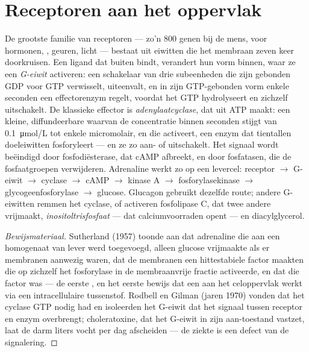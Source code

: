 \section{Receptoren aan het oppervlak}

\begin{proposition}\label{prop:b2:cell-signalling:gpcr}
De grootste familie van receptoren --- zo'n \num{800} genen bij de mens,
voor hormonen, , geuren, licht --- bestaat uit eiwitten die
het membraan zeven keer doorkruisen. Een ligand dat buiten bindt, verandert
hun vorm binnen, waar ze een \emph{G-eiwit} activeren: een schakelaar van
drie subeenheden die zijn gebonden GDP voor GTP verwisselt, uiteenvalt, en
in zijn GTP-gebonden vorm enkele seconden een effectorenzym regelt, voordat
het GTP hydrolyseert en zichzelf uitschakelt. De klassieke effector is
\emph{adenylaatcyclase}, dat uit ATP \emph{} maakt: een kleine,
diffundeerbare \emph{} waarvan de concentratie binnen
seconden stijgt van \qty{0.1}{\micro mol/L} tot enkele micromolair, en die
\emph{} activeert, een enzym dat tientallen doeleiwitten
fosforyleert --- en ze zo aan- of uitschakelt. Het signaal wordt beëindigd
door fosfodiësterase, dat cAMP afbreekt, en door fosfatasen, die de
fosfaatgroepen verwijderen. Adrenaline werkt zo op een levercel: receptor
$\to$ G-eiwit
$\to$ cyclase $\to$ cAMP $\to$ kinase A $\to$ fosforylasekinase
$\to$ glycogeenfosforylase $\to$ glucose. Glucagon gebruikt dezelfde route;
andere G-eiwitten remmen het cyclase, of activeren fosfolipase C, dat twee
andere  vrijmaakt, \emph{inositoltrisfosfaat} ---
dat calciumvoorraden opent --- en diacylglycerol.
\end{proposition}
\begin{proof}[Bewijsmateriaal]
Sutherland (1957) toonde aan dat adrenaline die aan een homogenaat van lever
werd toegevoegd, alleen glucose vrijmaakte als er membranen aanwezig waren,
dat de membranen een hittestabiele factor maakten die op zichzelf het
fosforylase in de membraanvrije fractie activeerde, en dat die factor
 was --- de eerste , en het eerste bewijs
dat een  aan het celoppervlak werkt via een intracellulaire
tussenstof. Rodbell en Gilman (jaren 1970) vonden dat het cyclase GTP nodig
had en isoleerden het G-eiwit dat het signaal tussen receptor en enzym
overbrengt; choleratoxine, dat het G-eiwit in zijn aan-toestand vastzet,
laat de darm liters vocht per dag afscheiden --- de ziekte is een defect van
de signalering.
\end{proof}

